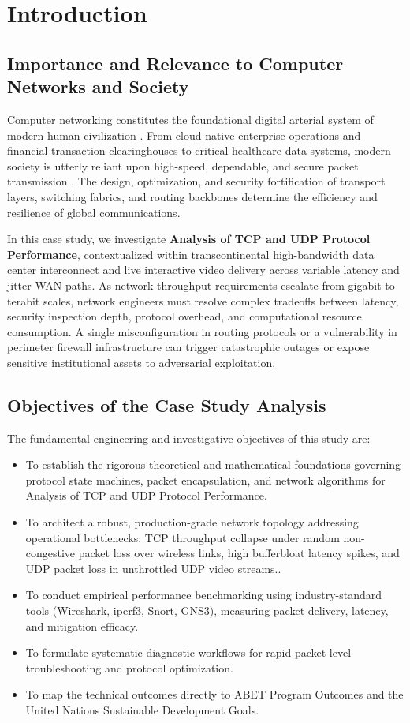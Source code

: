 \section{Introduction}

\subsection{Importance and Relevance to Computer Networks and Society}
Computer networking constitutes the foundational digital arterial system of modern human civilization \cite{kurose2021computer}. From cloud-native enterprise operations and financial transaction clearinghouses to critical healthcare data systems, modern society is utterly reliant upon high-speed, dependable, and secure packet transmission \cite{tanenbaum2021computer}. The design, optimization, and security fortification of transport layers, switching fabrics, and routing backbones determine the efficiency and resilience of global communications.

In this case study, we investigate \textbf{Analysis of TCP and UDP Protocol Performance}, contextualized within transcontinental high-bandwidth data center interconnect and live interactive video delivery across variable latency and jitter WAN paths. As network throughput requirements escalate from gigabit to terabit scales, network engineers must resolve complex tradeoffs between latency, security inspection depth, protocol overhead, and computational resource consumption. A single misconfiguration in routing protocols or a vulnerability in perimeter firewall infrastructure can trigger catastrophic outages or expose sensitive institutional assets to adversarial exploitation.

\subsection{Objectives of the Case Study Analysis}
The fundamental engineering and investigative objectives of this study are:
\begin{itemize}
  \item To establish the rigorous theoretical and mathematical foundations governing protocol state machines, packet encapsulation, and network algorithms for Analysis of TCP and UDP Protocol Performance.
  \item To architect a robust, production-grade network topology addressing operational bottlenecks: TCP throughput collapse under random non-congestive packet loss over wireless links, high bufferbloat latency spikes, and UDP packet loss in unthrottled UDP video streams..
  \item To conduct empirical performance benchmarking using industry-standard tools (Wireshark, iperf3, Snort, GNS3), measuring packet delivery, latency, and mitigation efficacy.
  \item To formulate systematic diagnostic workflows for rapid packet-level troubleshooting and protocol optimization.
  \item To map the technical outcomes directly to ABET Program Outcomes and the United Nations Sustainable Development Goals.
\end{itemize}
